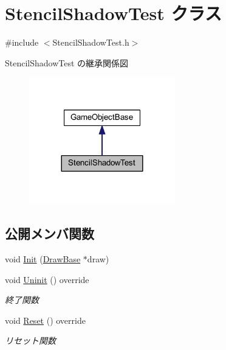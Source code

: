 \hypertarget{class_stencil_shadow_test}{}\section{Stencil\+Shadow\+Test クラス}
\label{class_stencil_shadow_test}


{\ttfamily \#include $<$Stencil\+Shadow\+Test.\+h$>$}



Stencil\+Shadow\+Test の継承関係図\nopagebreak
\begin{figure}[H]
\begin{center}
\leavevmode
\includegraphics[width=180pt]{class_stencil_shadow_test__inherit__graph}
\end{center}
\end{figure}
\subsection*{公開メンバ関数}
\begin{DoxyCompactItemize}
\item 
void \mbox{\hyperlink{class_stencil_shadow_test_a4a58695fafd134d750eb23ee5ec2bdb6}{Init}} (\mbox{\hyperlink{class_draw_base}{Draw\+Base}} $\ast$draw)
\item 
void \mbox{\hyperlink{class_stencil_shadow_test_a51b5d75aaba5673a13f950bd6b742720}{Uninit}} () override
\begin{DoxyCompactList}\small\item\em 終了関数 \end{DoxyCompactList}\item 
void \mbox{\hyperlink{class_stencil_shadow_test_a7691120143c64b99d6c8f5391be56e83}{Reset}} () override
\begin{DoxyCompactList}\small\item\em リセット関数 \end{DoxyCompactList}\end{DoxyCompactItemize}
